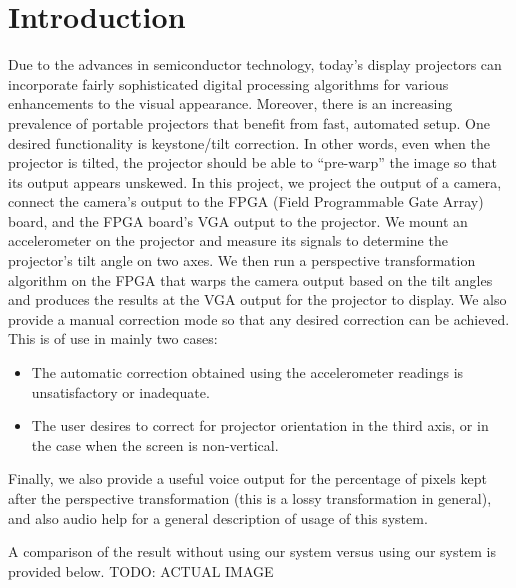 \documentclass{article}
\begin{document}
\section{Introduction}
Due to the advances in semiconductor technology,
today's display projectors can incorporate fairly sophisticated digital processing algorithms for various enhancements to the visual appearance.
Moreover, there is an increasing prevalence of portable projectors that benefit from fast, automated setup.
One desired functionality is keystone/tilt correction.
In other words, even when the projector is tilted, the projector should be able to ``pre-warp'' the image so that its output appears unskewed.
In this project, we project the output of a camera, connect the camera's output to the FPGA (Field Programmable Gate Array) board,
and the FPGA board's VGA output to the projector.
We mount an accelerometer on the projector and measure its signals to determine the projector's tilt angle on two axes.
We then run a perspective transformation algorithm on the FPGA that warps the camera output based on the tilt angles and produces the results at the VGA output for the projector to display.
We also provide a manual correction mode so that any desired correction can be achieved.
This is of use in mainly two cases:
\begin{itemize}
\item The automatic correction obtained using the accelerometer readings is unsatisfactory or inadequate.
\item The user desires to correct for projector orientation in the third axis, or in the case when the screen is non-vertical.
\end{itemize}
Finally, we also provide a useful voice output for the percentage of pixels kept after the perspective transformation (this is a lossy transformation in general),
and also audio help for a general description of usage of this system.

A comparison of the result without using our system versus using our system is provided below.
TODO: ACTUAL IMAGE
\end{document}

